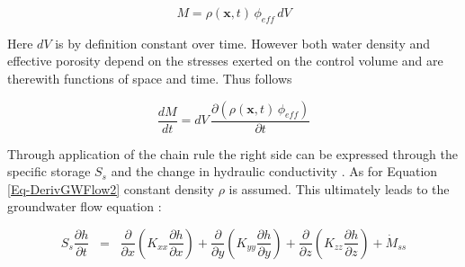 \begin{equation}
    \label{Eq-DerivGWFlow5}
    M = \rho(\bm{x},t) \, \phi_{eff} \, dV
\end{equation}

\noindent Here $dV$ is by definition constant over time. However both water density and effective porosity depend on the stresses exerted on the control volume and are therewith functions of space and time. 
Thus follows

\begin{equation}
    \label{Eq-DerivGWFlow6}
    \frac{dM}{dt} = dV \, \frac{\partial (\rho(\bm{x},t) \, \phi_{eff})}{\partial t}
\end{equation}

\noindent Through application of the chain rule the right side can be expressed through the specific storage $S_s$ and the change in hydraulic conductivity \parencite{Mays.2005}. 
As for Equation \eqref{Eq-DerivGWFlow2} constant density $\rho$ is assumed. This ultimately leads to the groundwater flow equation \parencite{Mays.2005}:

\begin{equation}
    \label{Eq-GWFlow}
    S_s \frac{\partial h}{\partial t} \; \; = \; \; \frac{\partial}{\partial x} \left(K_{xx} \frac{\partial h}{\partial x} \right) + \frac{\partial}{\partial y} \left(K_{yy} \frac{\partial h}{\partial y} \right) + \frac{\partial}{\partial z} \left(K_{zz} \frac{\partial h}{\partial z} \right) + \dot{M}_{ss}
\end{equation}